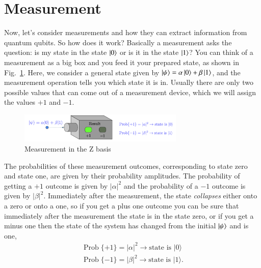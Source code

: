 
\section{Measurement}
\label{sec:measurement}

Now, let's consider measurements and how they can extract information from quantum qubits. So how does it work? Basically a measurement asks the question: is my state in the state $\left| 0 \right\rangle$ or is it in the state $\left| 1 \right\rangle$? You can think of a measurement as a big box and you feed it your prepared state, as shown in Fig.~\ref{fig:z-measure}. Here, we consider a general state given by $\left| \psi \right\rangle = \alpha\left| 0 \right\rangle+\beta\left| 1 \right\rangle$, and the measurement operation tells you which state it is in. Usually there are only two possible values that can come out of a measurement device, which we will assign the values $+1$ and $-1$.

\begin{figure}[H]
    \centering
    \includegraphics[width=0.7\textwidth]{lesson2/Pauli_z_machine.pdf}
    
        \caption{Measurement in the Z basis}
    
    \label{fig:z-measure}
\end{figure}

The probabilities of these measurement outcomes, corresponding to state zero and state one, are given by their probability amplitudes. The probability of getting a $+1$ outcome is given by $|\alpha|^2$ and the probability of a $-1$ outcome is given by $|\beta|^2$. Immediately after the measurement, the state \emph{collapses} either onto a zero or onto a one, so if you get a plus one outcome you can be sure that immediately after the measurement the state is in the state zero, or if you get a minus one then the state of the system has changed from the initial $\left| \psi \right\rangle$ and is one,
\begin{align}
\operatorname{Prob}\{+1\}=|\alpha|^2 \rightarrow \textrm{state is } |0\rangle \\
\operatorname{Prob}\{-1\}=|\beta|^2 \rightarrow \textrm{state is } |1\rangle.
\end{align}

